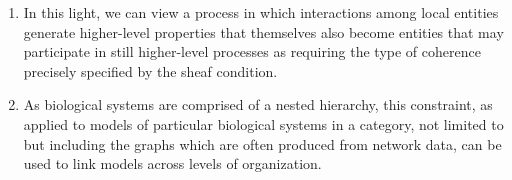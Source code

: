 \begin{frame}
\begin{enumerate}
\item In this light, we can view a process in which interactions among local entities generate higher-level properties that themselves also become entities that may participate in still higher-level processes as requiring the type of coherence precisely specified by the sheaf condition. 
\item As biological systems are comprised of a nested hierarchy, this constraint, as applied to models of particular biological systems in a category, not limited to but including the graphs which are often produced from network data, can be used to link models across levels of organization.
\end{enumerate}
\end{frame}